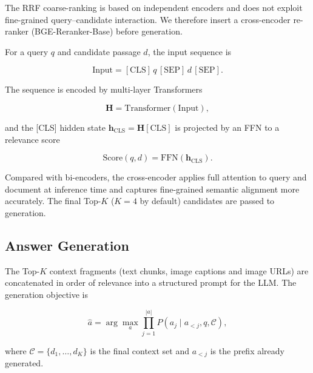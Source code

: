 \documentclass[applsci,article,submit,pdftex,moreauthors]{Definitions/mdpi}
\begin{document}
The RRF coarse-ranking is based on independent encoders and does not exploit fine-grained query--candidate interaction. We therefore insert a cross-encoder re-ranker (BGE-Reranker-Base) before generation.

For a query $q$ and candidate passage $d$, the input sequence is
\begin{linenomath}
\begin{equation}
\text{Input} = [\text{CLS}]\,q\,[\text{SEP}]\,d\,[\text{SEP}].
\label{eq:rerank-input}
\end{equation}
\end{linenomath}
The sequence is encoded by multi-layer Transformers
\begin{linenomath}
\begin{equation}
\mathbf{H} = \text{Transformer}(\text{Input}),
\label{eq:rerank-transformer}
\end{equation}
\end{linenomath}
and the [CLS] hidden state $\mathbf{h}_{\text{CLS}}=\mathbf{H}[\text{CLS}]$ is projected by an FFN to a relevance score
\begin{linenomath}
\begin{equation}
\text{Score}(q, d) = \text{FFN}(\mathbf{h}_{\text{CLS}}).
\label{eq:rerank-score}
\end{equation}
\end{linenomath}
Compared with bi-encoders, the cross-encoder applies full attention to query and document at inference time and captures fine-grained semantic alignment more accurately. The final Top-$K$ ($K=4$ by default) candidates are passed to generation.

\subsection{Answer Generation}
\label{sec:generation}

The Top-$K$ context fragments (text chunks, image captions and image URLs) are concatenated in order of relevance into a structured prompt for the LLM. The generation objective is
\begin{linenomath}
\begin{equation}
\hat{a} = \arg\max_{a}\prod_{j=1}^{|a|} P(a_j\mid a_{<j}, q, \mathcal{C}),
\label{eq:generation}
\end{equation}
\end{linenomath}
where $\mathcal{C}=\{d_1,\dots,d_K\}$ is the final context set and $a_{<j}$ is the prefix already generated.
\end{document}
